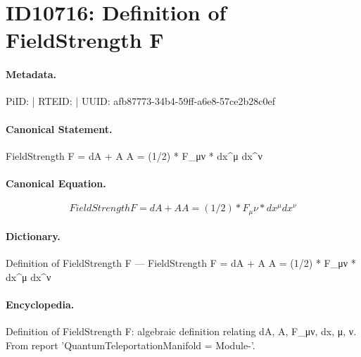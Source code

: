 \section*{ID10716: Definition of FieldStrength F}
\paragraph{Metadata.}
PiID:  | RTEID:  | UUID: afb87773-34b4-59ff-a6e8-57ce2b28c0ef

\paragraph{Canonical Statement.}
FieldStrength F = dA + A A = (1/2) * F\_μν * dx\textasciicircum{}μ dx\textasciicircum{}ν

\paragraph{Canonical Equation.}
\[
FieldStrength  F = dA + A  A = (1/2) * F_μν * dx^μ  dx^ν
\]

\paragraph{Dictionary.}
Definition of FieldStrength F — FieldStrength  F = dA + A  A = (1/2) * F\_μν * dx\textasciicircum{}μ  dx\textasciicircum{}ν

\paragraph{Encyclopedia.}
Definition of FieldStrength F: algebraic definition relating dA, A, F\_μν, dx, μ, ν. From report 'QuantumTeleportationManifold = Module-'.
